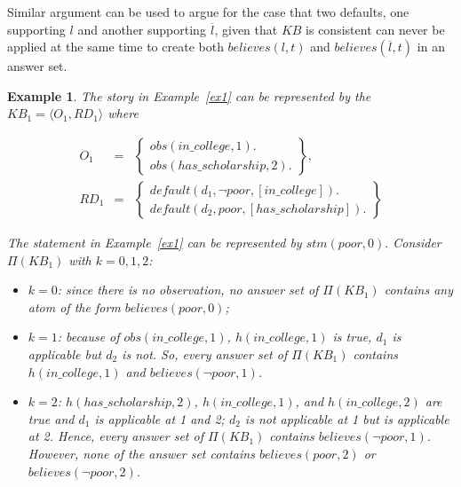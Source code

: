 \documentclass{article}
\newtheorem{example}{Example}%
\begin{document}
Similar argument can be used to argue for the case that two defaults, one supporting $l$ and another supporting $\overline{l}$, given that $KB$ is consistent can never be applied at the same time to create both $believes({l}, t)$ and $believes(\overline{l}, t)$ in an answer set.
\hfill\qedsymbol{}





%
\begin{example} \label{ex2}  
The story in Example~\ref{ex1} 
can be represented by the $KB_1 = \langle  O_1, RD_1 \rangle$ where 

{
\[
\begin{array}{lll}
O_1 & = & \left\{
\begin{array}{l} 
obs(in\_college, 1). \\ 
obs(has\_scholarship, 2).
\end{array}
\right \},   \\
 RD_1 & = & \left\{
\begin{array}{l} 
default(d_1, \neg poor, [in\_college]). \\
default(d_2, poor, [has\_scholarship]).  
\end{array}
\right \} 
\end{array} 
\]
}


The statement in Example~\ref{ex1} can be represented by  $stm(poor, 0).$ 
Consider   $\Pi(KB_1)$ with $k=0,1,2$:  
%
\begin{itemize} 
\item   $k=0$: since there is no observation, no answer set of $\Pi(KB_1)$ contains any atom of the form $believes(poor, 0)$; %
 
\item   $k=1$: because of $obs(in\_college,1)$, $h(in\_college,1)$ is true, 
$d_1$ is applicable but $d_2$ is not.  So, every answer set of $\Pi(KB_1)$ contains    $h(in\_college, 1)$ and $believes(\neg poor, 1)$.  

\item   $k=2$: %
$h(has\_scholarship,2)$, $h(in\_college,1)$, and $h(in\_college,2)$ are true and $d_1$ is applicable at 1 and 2; $d_2$ is not applicable at   1 but is applicable at   2.  Hence, every answer set of $\Pi(KB_1)$ contains $believes(\neg poor, 1)$.  However, none of the answer set   contains $believes(poor, 2)$ or $believes(\neg poor, 2)$.  


\end{itemize}
\end{example}
\end{document}
